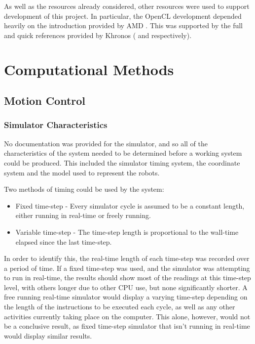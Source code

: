 \documentclass[10pt]{article}
\begin{document}
As well as the resources already considered, other resources were used to
support development of this project.  In particular, the OpenCL development
depended heavily on the introduction provided by AMD \cite{amdOpenCLTutorial}.
This was supported by the full and quick references provided by Khronos
(\cite{openCl11Spec} and \cite{openCl11QuickRef} respectively).
  
\section{Computational Methods}

\subsection{Motion Control\label{sub:motionControl}}

\subsubsection{Simulator Characteristics}

No documentation was provided for the simulator, and so all of the
characteristics of the system needed to be determined before a working system
could be produced.  This included the simulator timing system, the coordinate
system and the model used to represent the robots.

Two methods of timing could be used by the system:
\begin{itemize}
 \item Fixed time-step - Every simulator cycle is assumed to be a constant length, either running in real-time or freely running.
 \item Variable time-step - The time-step length is proportional to the wall-time elapsed since the last time-step.
\end{itemize}

In order to identify this, the real-time length of each time-step was recorded
over a period of time.  If a fixed time-step was used, and the simulator was
attempting to run in real-time, the results should show most of the readings at
this time-step level, with others longer due to other CPU use, but none
significantly shorter.  A free running real-time simulator would display a
varying time-step depending on the length of the instructions to be executed
each cycle, as well as any other activities currently taking place on the
computer.  This alone, however, would not be a conclusive result, as fixed
time-step simulator that isn't running in real-time would display similar
results.
\end{document}

